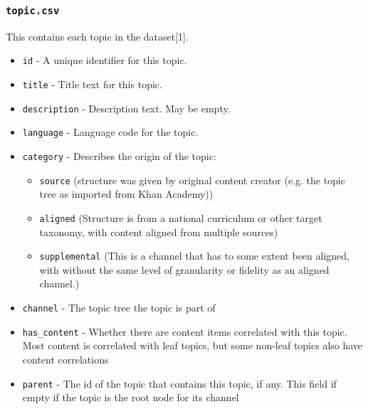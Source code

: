 \documentclass{article}
\begin{document}
\subsubsection{\texttt{topic.csv}} 

This contains each topic in the dataset[1].

\begin{itemize}
    
\item  \texttt{id} - A unique identifier for this topic.

\item  \texttt{title} - Title text for this topic.

\item  \texttt{description} - Description text. May be empty.

\item  \texttt{language} - Language code for the topic.

\item  \texttt{category} - Describes the origin of the topic:

\begin{itemize}
    \item \texttt{source} (structure was given by original content creator (e.g. the topic tree as imported from Khan Academy))
    
    \item \texttt{aligned} (Structure is from a national curriculum or other target taxonomy, with content aligned from multiple sources)

    \item \texttt{supplemental} (This is a channel that has to some extent been aligned, with without the same level of granularity or fidelity as an aligned channel.) 
    
\end{itemize}

\item  \texttt{channel} - The topic tree the topic is part of

\item  \texttt{has\_content} - Whether there are content items correlated with this topic. Most content is correlated with leaf topics, but some non-leaf topics also have content correlations

\item  \texttt{parent} - The id of the topic that contains this topic, if any. This field if empty if the topic is the root node for its channel

\end{itemize} 
\end{document}
